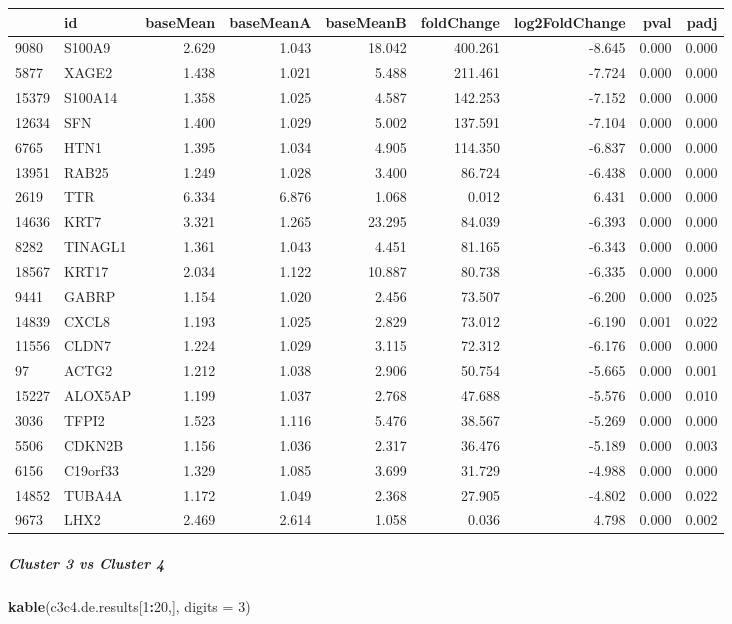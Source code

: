 \documentclass[]{article}
\newenvironment{Shaded}{\begin{snugshade}}{\end{snugshade}}
\newcommand{\DataTypeTok}[1]{\textcolor[rgb]{0.13,0.29,0.53}{#1}}
\newcommand{\DecValTok}[1]{\textcolor[rgb]{0.00,0.00,0.81}{#1}}
\newcommand{\KeywordTok}[1]{\textcolor[rgb]{0.13,0.29,0.53}{\textbf{#1}}}
\newcommand{\NormalTok}[1]{#1}
\newcommand{\OperatorTok}[1]{\textcolor[rgb]{0.81,0.36,0.00}{\textbf{#1}}}
\let\oldsubparagraph\subparagraph
\renewcommand{\subparagraph}[1]{\oldsubparagraph{#1}\mbox{}}
\begin{document}
\begin{longtable}[]{@{}llrrrrrrr@{}}
\toprule
& id & baseMean & baseMeanA & baseMeanB & foldChange & log2FoldChange &
pval & padj\tabularnewline
\midrule
\endhead
9080 & S100A9 & 2.629 & 1.043 & 18.042 & 400.261 & -8.645 & 0.000 &
0.000\tabularnewline
5877 & XAGE2 & 1.438 & 1.021 & 5.488 & 211.461 & -7.724 & 0.000 &
0.000\tabularnewline
15379 & S100A14 & 1.358 & 1.025 & 4.587 & 142.253 & -7.152 & 0.000 &
0.000\tabularnewline
12634 & SFN & 1.400 & 1.029 & 5.002 & 137.591 & -7.104 & 0.000 &
0.000\tabularnewline
6765 & HTN1 & 1.395 & 1.034 & 4.905 & 114.350 & -6.837 & 0.000 &
0.000\tabularnewline
13951 & RAB25 & 1.249 & 1.028 & 3.400 & 86.724 & -6.438 & 0.000 &
0.000\tabularnewline
2619 & TTR & 6.334 & 6.876 & 1.068 & 0.012 & 6.431 & 0.000 &
0.000\tabularnewline
14636 & KRT7 & 3.321 & 1.265 & 23.295 & 84.039 & -6.393 & 0.000 &
0.000\tabularnewline
8282 & TINAGL1 & 1.361 & 1.043 & 4.451 & 81.165 & -6.343 & 0.000 &
0.000\tabularnewline
18567 & KRT17 & 2.034 & 1.122 & 10.887 & 80.738 & -6.335 & 0.000 &
0.000\tabularnewline
9441 & GABRP & 1.154 & 1.020 & 2.456 & 73.507 & -6.200 & 0.000 &
0.025\tabularnewline
14839 & CXCL8 & 1.193 & 1.025 & 2.829 & 73.012 & -6.190 & 0.001 &
0.022\tabularnewline
11556 & CLDN7 & 1.224 & 1.029 & 3.115 & 72.312 & -6.176 & 0.000 &
0.000\tabularnewline
97 & ACTG2 & 1.212 & 1.038 & 2.906 & 50.754 & -5.665 & 0.000 &
0.001\tabularnewline
15227 & ALOX5AP & 1.199 & 1.037 & 2.768 & 47.688 & -5.576 & 0.000 &
0.010\tabularnewline
3036 & TFPI2 & 1.523 & 1.116 & 5.476 & 38.567 & -5.269 & 0.000 &
0.000\tabularnewline
5506 & CDKN2B & 1.156 & 1.036 & 2.317 & 36.476 & -5.189 & 0.000 &
0.003\tabularnewline
6156 & C19orf33 & 1.329 & 1.085 & 3.699 & 31.729 & -4.988 & 0.000 &
0.000\tabularnewline
14852 & TUBA4A & 1.172 & 1.049 & 2.368 & 27.905 & -4.802 & 0.000 &
0.022\tabularnewline
9673 & LHX2 & 2.469 & 2.614 & 1.058 & 0.036 & 4.798 & 0.000 &
0.002\tabularnewline
\bottomrule
\end{longtable}

\hypertarget{cluster-3-vs-cluster-4}{%
\subparagraph{Cluster 3 vs Cluster 4}\label{cluster-3-vs-cluster-4}}

\begin{Shaded}
\begin{Highlighting}[]
\KeywordTok{kable}\NormalTok{(c3c4.de.results[}\DecValTok{1}\OperatorTok{:}\DecValTok{20}\NormalTok{,], }\DataTypeTok{digits =} \DecValTok{3}\NormalTok{)}
\end{Highlighting}
\end{Shaded}
\end{document}
